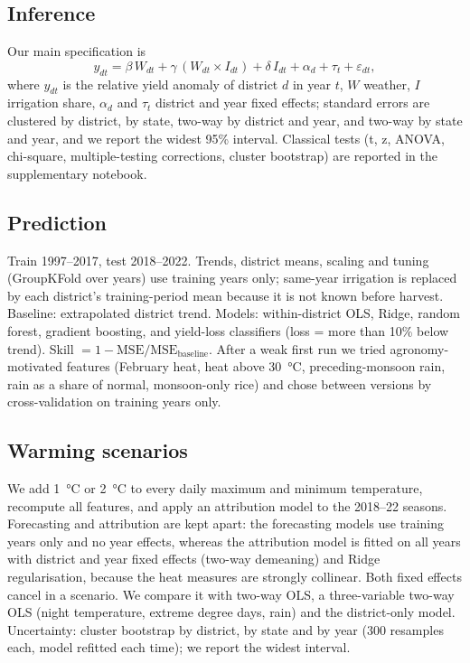 \documentclass[conference]{IEEEtran}
\begin{document}
\subsection{Inference}
Our main specification is
\begin{equation}
y_{dt} = \beta\,W_{dt} + \gamma\,(W_{dt}\times I_{dt}) + \delta\,I_{dt} + \alpha_d + \tau_t + \varepsilon_{dt},
\end{equation}
where $y_{dt}$ is the relative yield anomaly of district $d$ in year $t$, $W$ weather, $I$ irrigation share, $\alpha_d$
and $\tau_t$ district and year fixed effects; standard errors are clustered by district, by state, two-way by district and year, and two-way by state and
year, and we report the widest 95\% interval. Classical tests (t, z, ANOVA,
chi-square, multiple-testing corrections, cluster bootstrap) are reported in the supplementary notebook.

\subsection{Prediction}
Train 1997--2017, test 2018--2022. Trends, district means, scaling and tuning (GroupKFold over years) use training
years only; same-year irrigation is replaced by each district's training-period mean because it is not known before
harvest. Baseline: extrapolated district trend. Models: within-district OLS, Ridge, random forest, gradient boosting,
and yield-loss classifiers (loss = more than 10\% below trend). Skill $=1-\mathrm{MSE}/\mathrm{MSE}_{\text{baseline}}$.
After a weak first run we tried agronomy-motivated features (February heat, heat above \SI{30}{\degreeCelsius},
preceding-monsoon rain, rain as a share of normal, monsoon-only rice) and chose between versions by cross-validation on
training years only.

\subsection{Warming scenarios}
We add \SI{1}{\degreeCelsius} or \SI{2}{\degreeCelsius} to every daily maximum and minimum temperature, recompute
all features, and apply an attribution model to the 2018--22 seasons. Forecasting and attribution are kept apart: the
forecasting models use training years only and no year effects, whereas the attribution model is fitted on all
years with district and year fixed effects (two-way demeaning) and Ridge regularisation, because the heat measures are
strongly collinear. Both fixed effects cancel in a scenario. We compare it with two-way OLS, a three-variable two-way
OLS (night temperature, extreme degree days, rain) and the district-only model. Uncertainty: cluster bootstrap by
district, by state and by year (300 resamples each, model refitted each time); we report the widest interval.
\end{document}
